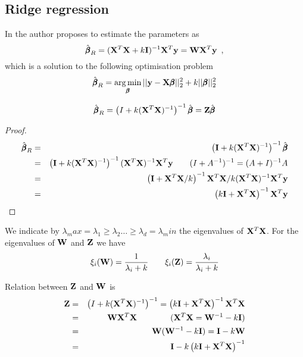 \subsection{Ridge regression}\label{sec:RidgeRegression}

In \cite{Hoerl1970} the author proposes to estimate the parameters as
\begin{equation}\label{eq:Ridge}
\hat{\pmb{\beta}}_R = (\mathbf{X}^T \mathbf{X} + k \mathbf{I})^{-1} \mathbf{X}^T \mathbf{y} = \mathbf{W} \mathbf{X}^T \mathbf{y} \enspace,
\end{equation}
which is a solution to the following optimisation problem
\begin{equation}\label{eq:RidgeProblem}
\hat{\pmb{\beta}}_R = \operatorname*{arg\,min}_{\pmb{\beta}} ||\mathbf{y} - \mathbf{X} \pmb{\beta}||_2^2 + k ||\pmb{\beta}||_2^2
\end{equation}

\begin{proposition}
\begin{equation}
\hat{\pmb{\beta}}_R = \left( I + k(\mathbf{X}^T \mathbf{X})^{-1} \right)^{-1} \hat{\pmb{\beta}} = \mathbf{Z} \hat{\pmb{\beta}}
\end{equation}
\end{proposition}

\begin{proof}
\begin{eqnarray*}
\hat{\pmb{\beta}}_R & = & \left(\mathbf{I} + k(\mathbf{X}^T \mathbf{X})^{-1} \right)^{-1} \hat{\pmb{\beta}} \\
& = &
\left( \mathbf{I} + k(\mathbf{X}^T \mathbf{X})^{-1} \right)^{-1} (\mathbf{X}^T \mathbf{X})^{-1} \mathbf{X}^T \mathbf{y} \qquad \small{(I+A^{-1})^{-1} = (A + I)^{-1}} A\\
& = &
\left( \mathbf{I} + \mathbf{X}^T \mathbf{X}/k \right)^{-1} \mathbf{X}^T \mathbf{X} /k (\mathbf{X}^T \mathbf{X})^{-1} \mathbf{X}^T \mathbf{y}  \\
& = &
\left( k\mathbf{I} + \mathbf{X}^T \mathbf{X} \right)^{-1} \mathbf{X}^T \mathbf{y}  \\
\end{eqnarray*}
\end{proof}

We indicate by $\lambda_max = \lambda_1 \geq \lambda_2 \ldots \geq \lambda_d = \lambda_min$ the eigenvalues of $\mathbf{X}^T \mathbf{X}$. For the eigenvalues of $\mathbf{W}$ and $\mathbf{Z}$  we have
\begin{equation}
\xi_i(\mathbf{W}) = \frac{1}{\lambda_i + k} \qquad \xi_i(\mathbf{Z}) = \frac{\lambda_i}{\lambda_i + k}
\end{equation}

Relation between $\mathbf{Z}$ and $\mathbf{W}$ is
\begin{eqnarray}
\mathbf{Z} & = & \left( I + k(\mathbf{X}^T \mathbf{X})^{-1} \right)^{-1} 
= \left( k\mathbf{I} + \mathbf{X}^T \mathbf{X} \right)^{-1} \mathbf{X}^T \mathbf{X} \nonumber \\
& = & \mathbf{W} \mathbf{X}^T \mathbf{X} \qquad \qquad (\mathbf{X}^T \mathbf{X} = \mathbf{W}^{-1} - k\mathbf{I})\nonumber \\
& = &
\mathbf{W} (\mathbf{W}^{-1} - k\mathbf{I})  = \mathbf{I} - k \mathbf{W} \\
& = & \mathbf{I} - k\left( k\mathbf{I} + \mathbf{X}^T \mathbf{X} \right)^{-1} \nonumber
\end{eqnarray}

